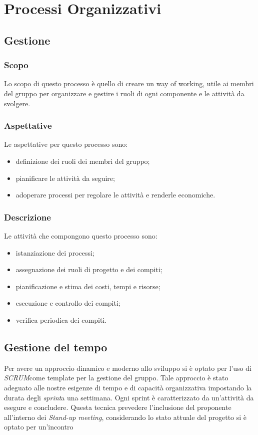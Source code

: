 \section{Processi Organizzativi}
	\subsection{Gestione}
		\subsubsection{Scopo}
			Lo scopo di questo processo è quello di creare un way of working, utile ai membri del gruppo per organizzare e gestire i ruoli di ogni componente e le attività da svolgere.%
  		\subsubsection{Aspettative}
  			Le aspettative per questo processo sono:
  			\begin{itemize}
  				\item definizione dei ruoli dei membri del gruppo;
  				\item pianificare le attività da seguire;
  				\item adoperare processi per regolare le attività e renderle economiche.
			\end{itemize}
   		\subsubsection{Descrizione}
   			Le attività che compongono questo processo sono:
   			\begin{itemize}
   				\item istanziazione dei processi;
   				\item assegnazione dei ruoli di progetto e dei compiti;
   				\item pianificazione e stima dei costi, tempi e risorse;
	   			\item esecuzione e controllo dei compiti;
   				\item verifica periodica dei compiti.
		   	\end{itemize}
			\subsection{Gestione del tempo}
				Per avere un approccio dinamico e moderno allo sviluppo si è optato per l'uso
				di \textit{SCRUM}\glo come template per la gestione del gruppo.
				Tale approccio è stato adeguato alle nostre esigenze di tempo e di capacità
				organizzativa impostando la durata degli \textit{sprint}\glo a una settimana.
				Ogni sprint è caratterizzato da un'attività da esegure e concludere.
				Questa tecnica prevedere l'inclusione del proponente all'interno dei
				\textit{Stand-up meeting}\glos, considerando lo stato attuale del progetto
				si è optato per un'incontro

